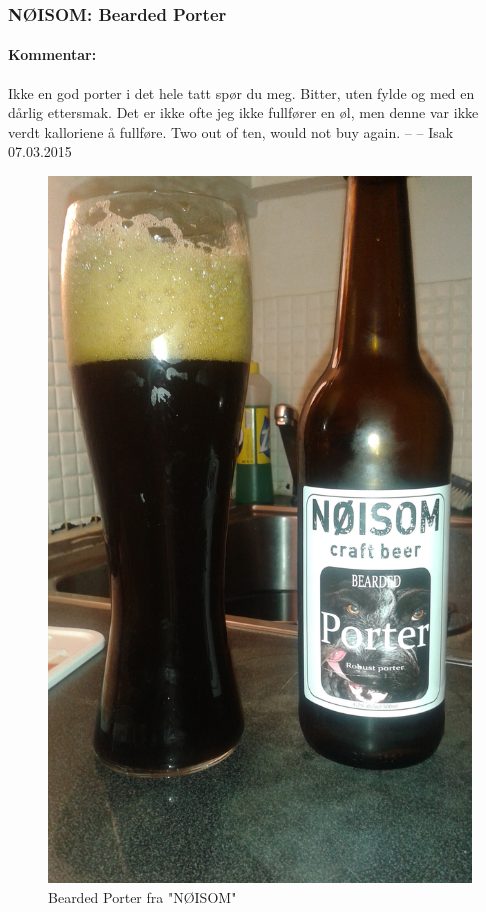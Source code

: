 \documentclass[12pt,a4paper,oneside,norsk]{article}
\begin{document}
\subsubsection{NØISOM: Bearded Porter}
\paragraph{Kommentar:} Ikke en god porter i det hele tatt spør du meg. Bitter, uten fylde og med en dårlig ettersmak. Det er ikke ofte jeg ikke fullfører en øl, men denne var ikke verdt kalloriene å fullføre. Two out of ten, would not buy again. 
\newline
-- -- Isak 07.03.2015

\begin{figure} [H]
\centering
\includegraphics[scale=0.1, angle=270]{Bilder/Ol/beardedporter}
\caption{Bearded Porter fra "NØISOM"}
\end{figure}
\end{document}
